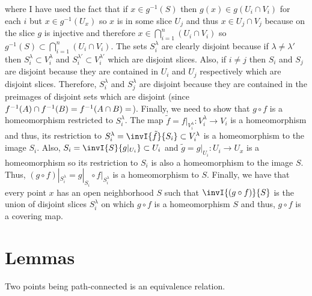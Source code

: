 \documentclass[12pt]{extarticle}
\begin{document}
where I have used the fact that if $x \in g^{-1}(S)$ then $g(x) \in g(U_i \cap V_i)$ for each $i$ but $x \in g^{-1}(U_x)$ so $x$ is in some slice $U_{j}$ and thus $x \in U_{j} \cap V_{j}$ because on the slice $g$ is injective and therefore $x \in \bigcap\limits_{i = 1}^n (U_i \cap V_i)$ so $g^{-1}(S) \subset \bigcap\limits_{i = 1}^n (U_i \cap V_i)$. The sets $S_i^\lambda$ are clearly disjoint because if $\lambda \neq \lambda'$ then $S_i^\lambda \subset V_i^\lambda$ and $S_i^{\lambda'} \subset V_i^{\lambda'}$ which are disjoint slices. Also, if $i \neq j$ then $S_i$ and $S_j$ are disjoint because they are contained in $U_i$ and $U_j$ respectively which are disjoint slices. Therefore, $S_i^\lambda$ and $S_j^\lambda$ are disjoint because they are contained in the preimages of disjoint sets which are disjoint (since $f^{-1}(A) \cap f^{-1}(B) = f^{-1}(A \cap B) = \empty$). Finally, we need to show that $g \circ f$ is a homeomorphism restricted to $S_i^\lambda$. The map $\tilde{f} = f|_{V_i^\lambda} : V_i^\lambda \to V_i$ is a homeomorphism and thus, its restriction to $S_i^\lambda = \invI{\tilde{f}}{S_i} \subset V_i^\lambda$ is a homeomorphism to the image $S_i$. Also, $S_i = \invI{S}{g|_{U_i}} \subset U_i$ and $\tilde{g} = g|_{U_i} : U_i \to U_x$ is a homeomorphism so its restriction to $S_i$ is also a homeomorphism to the image $S$. Thus, $(g \circ f) |_{S_i^\lambda} = g |_{S_i} \circ f|_{S_i^\lambda}$ is a homeomorphism to $S$. Finally, we have that every point $x$ has an open neighborhood $S$ such that $\invI{(g \circ f)}{S}$ is the union of disjoint slices $S_i^\lambda$ on which $g \circ f$ is a homeomorphism $S$ and thus, $g \circ f$ is a covering map.   
\section*{Lemmas}


\begin{lemma} \label{patheq}
Two points being path-connected is an equivalence relation.
\end{lemma}
\end{document}

